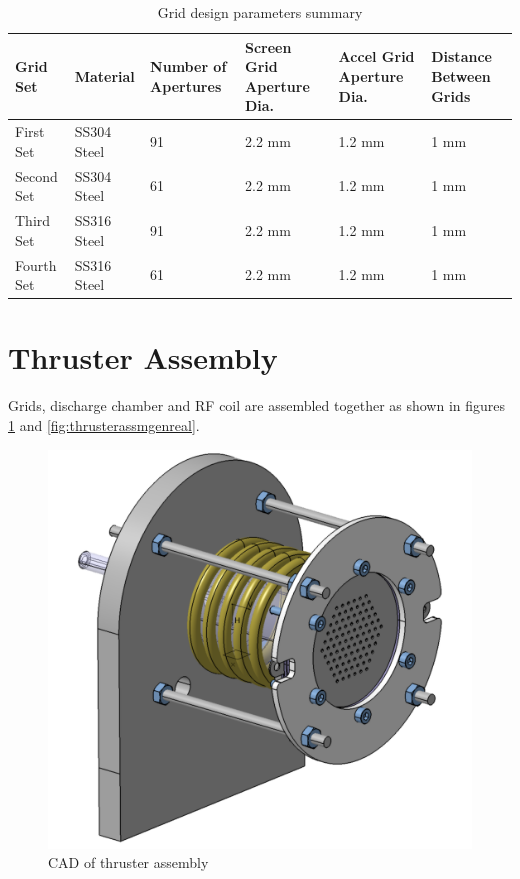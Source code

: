 \begin{table}[ht]
    \centering
    \begin{tabular}{||p{2cm}|p{2.2cm}|p{2.2cm}|p{2.5cm}|p{2.5cm}|p{2.7cm}||}
        \hline
        \textbf{Grid Set} & \textbf{Material} & \textbf{Number of Apertures} & \textbf{Screen Grid Aperture Dia.} & \textbf{Accel Grid Aperture Dia.} & \textbf{Distance Between Grids} \\
        \hline
        First Set & SS304 Steel & 91 & 2.2 mm & 1.2 mm & 1 mm \\
        \hline
        Second Set & SS304 Steel & 61 & 2.2 mm & 1.2 mm & 1 mm \\
        \hline
        Third Set & SS316 Steel & 91 & 2.2 mm & 1.2 mm & 1 mm \\
\hline
Fourth Set & SS316 Steel & 61 & 2.2 mm & 1.2 mm & 1 mm\\
\hline
    \end{tabular}
    \caption{Grid design parameters summary}
    \label{table:gridparamsum}
\end{table}

\section{Thruster Assembly}
Grids, discharge chamber and RF coil are assembled together as shown in figures \ref{fig:thrusterassmgencad} and \ref{fig:thrusterassmgenreal}.

\begin{figure}[ht]
    \centering
    \includegraphics[scale=0.35]{fig/assm/assm_general.png}
    \caption{CAD of thruster assembly}
    \label{fig:thrusterassmgencad}
\end{figure}


